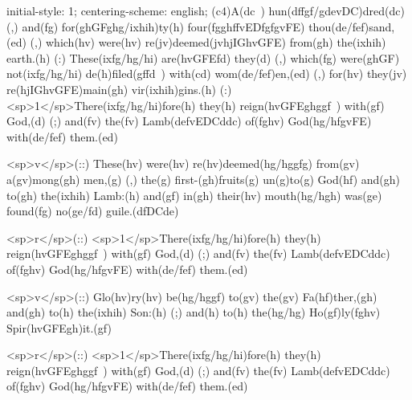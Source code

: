 initial-style: 1;
centering-scheme: english;
(c4)A(dc~) hun(dffgf/gdevDC)dred(dc) (,) and(fg) for(ghGFghg/ixhih)ty(h) four(fgghffvEDfgfgvFE) thou(de/fef)sand,(ed) (,) which(hv) were(hv) re(jv)deemed(jvhjIGhvGFE) from(gh) the(ixhih) earth.(h) (:) These(ixfg/hg/hi) are(hvGFEfd) they(d) (,) which(fg) were(ghGF) not(ixfg/hg/hi) de(h)filed(gffd~) with(cd) wom(de/fef)en,(ed) (,) for(hv) they(jv) re(hjIGhvGFE)main(gh) vir(ixhih)gins.(h) (:) <sp>1</sp>There(ixfg/hg/hi)fore(h) they(h) reign(hvGFEghggf~) with(gf) God,(d) (;) and(fv) the(fv) Lamb(defvEDCddc) of(fghv) God(hg/hfgvFE) with(de/fef) them.(ed)

<sp>v</sp>(::) These(hv) were(hv) re(hv)deemed(hg/hggfg) from(gv) a(gv)mong(gh) men,(g) (,) the(g) first-(gh)fruits(g) un(g)to(g) God(hf) and(gh) to(gh) the(ixhih) Lamb:(h) and(gf) in(gh) their(hv) mouth(hg/hgh) was(ge) found(fg) no(ge/fd) guile.(dfDCde)

<sp>r</sp>(::) <sp>1</sp>There(ixfg/hg/hi)fore(h) they(h) reign(hvGFEghggf~) with(gf) God,(d) (;) and(fv) the(fv) Lamb(defvEDCddc) of(fghv) God(hg/hfgvFE) with(de/fef) them.(ed)

<sp>v</sp>(::) Glo(hv)ry(hv) be(hg/hggf) to(gv) the(gv) Fa(hf)ther,(gh) and(gh) to(h) the(ixhih) Son:(h) (;) and(h) to(h) the(hg/hg) Ho(gf)ly(fghv) Spir(hvGFEgh)it.(gf)

<sp>r</sp>(::) <sp>1</sp>There(ixfg/hg/hi)fore(h) they(h) reign(hvGFEghggf~) with(gf) God,(d) (;) and(fv) the(fv) Lamb(defvEDCddc) of(fghv) God(hg/hfgvFE) with(de/fef) them.(ed)